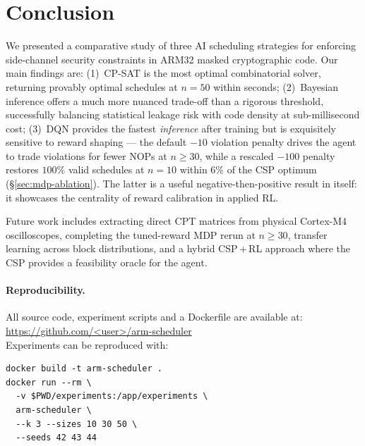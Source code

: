 \documentclass[letterpaper]{article}
\begin{document}
\section{Conclusion}
\label{sec:conclusion}

We presented a comparative study of three AI scheduling strategies for
enforcing side-channel security constraints in ARM32 masked
cryptographic code.  Our main findings are: (1)~CP-SAT is the most
optimal combinatorial solver, returning provably optimal schedules at
$n=50$ within seconds; (2)~Bayesian inference offers a much more nuanced
trade-off than a rigorous threshold, successfully balancing statistical
leakage risk with code density at sub-millisecond cost;
(3)~DQN provides the fastest \emph{inference} after training but is
exquisitely sensitive to reward shaping --- the default
$-10$ violation penalty drives the agent to trade violations for fewer
NOPs at $n \ge 30$, while a rescaled $-100$ penalty restores
$100\%$ valid schedules at $n=10$ within $6\%$ of the CSP optimum
(\S\ref{sec:mdp-ablation}). The latter is a useful negative-then-positive
result in itself: it showcases the centrality of reward calibration in
applied RL.

Future work includes extracting direct CPT matrices from physical
Cortex-M4 oscilloscopes, completing the tuned-reward MDP rerun at
$n \ge 30$, transfer learning across block distributions, and a hybrid
CSP\,+\,RL approach where the CSP provides a feasibility oracle for the
agent.

\paragraph{Reproducibility.}
All source code, experiment scripts and a Dockerfile are available at:\\
\url{https://github.com/<user>/arm-scheduler}\\
Experiments can be reproduced with:
\begin{small}
  \begin{verbatim}
docker build -t arm-scheduler .
docker run --rm \
  -v $PWD/experiments:/app/experiments \
  arm-scheduler \
  --k 3 --sizes 10 30 50 \
  --seeds 42 43 44
\end{verbatim}
\end{small}



\end{document}
